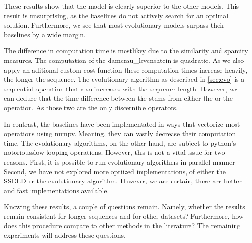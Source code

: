 \documentclass[./../../paper.tex]{subfiles}
\begin{document}
These results show that the model  is clearly superior to the other models. This result is unsurprising, as the baselines do not actively search for an optimal solution. Furthermore, we see that most evolutionary models surpass their baselines by a wide margin. 

The difference in computation time is mostlikey due to the similarity and sparcity measures. The computation of the \gls{damerau_levenshtein} is quadratic. As we also apply an aditional custom cost function these computation times increase heavily, the longer the sequence. The evolutionary algorithm as described in \autoref{sec:evo} is a sequential operation that also increases with the sequence length. However, we can deduce that the time difference between the  stems from either the  or the  operation. As those two are the only discernible operators. 

In contrast, the baselines have been implementated in ways that vectorize most operations using numpy. Meaning, they can vastly decrease their computation time. The evolutionary algorithms, on the other hand, are subject to python's notorious\needscite slow-looping operations. However, this is not a vital issue for two reasons. First, it is possible to run evolutionary algorithms in parallel manner\needscite. Second, we have not explored more optiized implementations, of either the \gls{SSDLD} or the evolutionary algorithm. However, we are certain, there are better and fast implementations available. 

Knowing these results, a couple of questions remain. Namely, whether the results remain consistent for longer sequences and for other datasets? Furthermore, how does this procedure compare to other methods in the literature? The remaining experiments will address these questions. 
\end{document}
